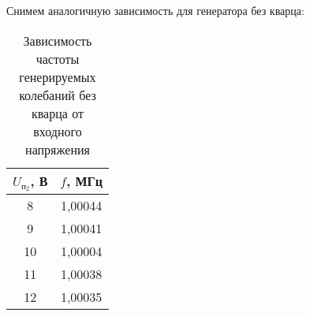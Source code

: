 \documentclass[a4paper,12pt]{report}
\begin{document}
Снимем аналогичную зависимость для генератора без кварца:

\begin{table}[H]
\begin{tabular}{|c|c|}
\hline
$U_{\text{п}_2}$, В & $f$, МГц  \\ \hline
8        & 1,00044 \\ \hline
9        & 1,00041 \\ \hline
10       & 1,00004 \\ \hline
11       & 1,00038 \\ \hline
12       & 1,00035 \\ \hline
\end{tabular}
\caption{Зависимость частоты генерируемых колебаний без кварца от входного напряжения}
\end{table}
\end{document}
